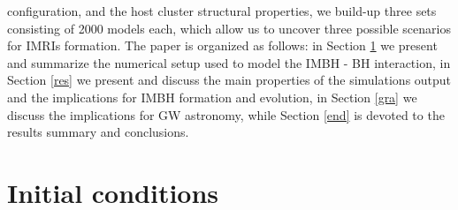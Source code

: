 \documentclass[article]{aa}
\begin{document}
configuration, and the host cluster structural properties, we build-up three sets consisting of 2000 models each, which allow us to uncover three possible scenarios for IMRIs formation.  
The paper is organized as follows: in Section \ref{num} we
present and summarize the numerical setup used to model the IMBH - BH
interaction, in Section \ref{res} we present and discuss the main properties of
the simulations output and the implications for IMBH formation and evolution, in Section \ref{gra} we discuss the implications for GW astronomy, while Section \ref{end} is devoted to the results summary and conclusions. 





\section{Initial conditions} 
\label{num}
\end{document}
